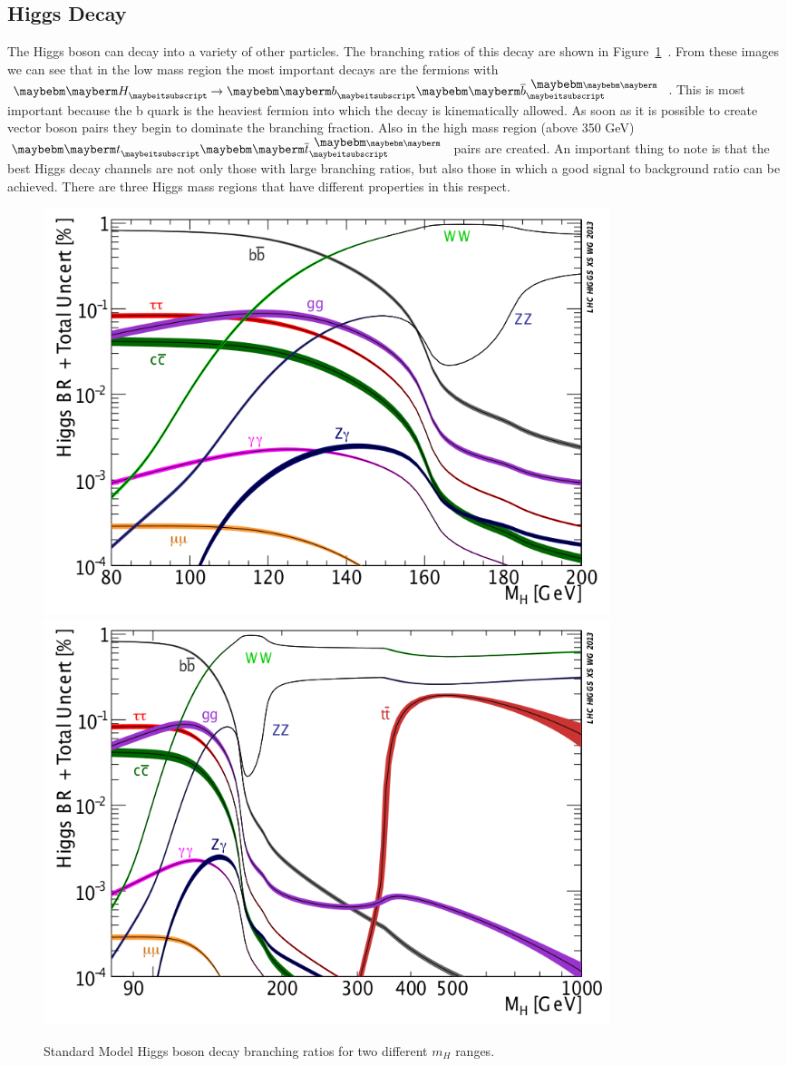 \subsection{Higgs Decay}

The Higgs boson can decay into a variety of other particles.  The branching ratios of this decay are shown in Figure~\ref{fig:Higgs_decay}~\cite{LHC_Higgs_Gallery}.  From these images we can see that in the low mass region the most important decays are the fermions with $\PH \rightarrow \Pqb\Paqb$.  This is most important because the b quark is the heaviest fermion into which the decay is kinematically allowed. As soon as it is possible to create vector boson pairs they begin to dominate the branching fraction.  Also in the high mass region (above 350 GeV) $\Pqt\Paqt$ pairs are created.  An important thing to note is that the best Higgs decay channels are not only those with large branching ratios, but also those in which a good signal to background ratio can be achieved. There are three Higgs mass regions that have different properties in this respect.


\begin{figure}[htb]
\centering
\includegraphics[width=0.8\textwidth]{StandardModel/Higgs_BR_LM_RECT.png} \includegraphics[width=0.8\textwidth]{StandardModel/Higgs_BR_RECT.png}
\caption{\small Standard Model Higgs boson decay branching ratios for two different $m_H$ ranges. ~\cite{LHC_Higgs_Gallery}
         }
\label{fig:Higgs_decay}
\end{figure}


